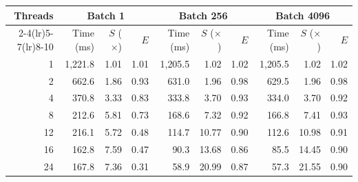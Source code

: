 \begin{tabular}{rrrrrrrrrr}
\toprule
Threads & \multicolumn{3}{c}{Batch 1} & \multicolumn{3}{c}{Batch 256} & \multicolumn{3}{c}{Batch 4096} \\
\cmidrule(lr){2-4}\cmidrule(lr){5-7}\cmidrule(lr){8-10}
 & Time (ms) & $S$ ($\times$) & $E$ & Time (ms) & $S$ ($\times$) & $E$ & Time (ms) & $S$ ($\times$) & $E$ \\
\midrule
1 & 1{,}221.8 & 1.01 & 1.01 & 1{,}205.5 & 1.02 & 1.02 & 1{,}205.5 & 1.02 & 1.02 \\
2 & 662.6 & 1.86 & 0.93 & 631.0 & 1.96 & 0.98 & 629.5 & 1.96 & 0.98 \\
4 & 370.8 & 3.33 & 0.83 & 333.8 & 3.70 & 0.93 & 334.0 & 3.70 & 0.92 \\
8 & 212.6 & 5.81 & 0.73 & 168.6 & 7.32 & 0.92 & 166.8 & 7.41 & 0.93 \\
12 & 216.1 & 5.72 & 0.48 & 114.7 & 10.77 & 0.90 & 112.6 & 10.98 & 0.91 \\
16 & 162.8 & 7.59 & 0.47 & 90.3 & 13.68 & 0.86 & 85.5 & 14.45 & 0.90 \\
24 & 167.8 & 7.36 & 0.31 & 58.9 & 20.99 & 0.87 & 57.3 & 21.55 & 0.90 \\
\bottomrule
\end{tabular}
